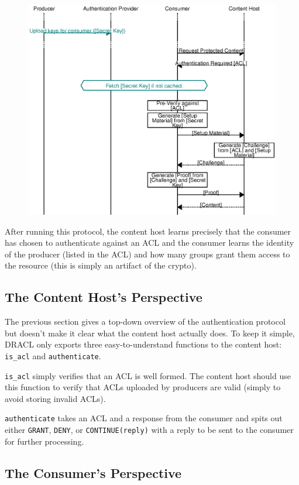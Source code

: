 \documentclass[pdftex,12pt,a4papaer,twoside,notitlepage]{report}
\begin{document}
\begin{figure}[H]
    \includegraphics{auth.eps}
\end{figure}

After running this protocol, the content host learns precisely that the consumer
has chosen to authenticate against an ACL and the consumer learns the identity
of the producer (listed in the ACL) and how many groups grant them access to the
resource (this is simply an artifact of the crypto).

\subsection{The Content Host's Perspective}

The previous section gives a top-down overview of the authentication protocol
but doesn't make it clear what the content host actually does. To keep it
simple, DRACL only exports three easy-to-understand functions to the content
host: \verb=is_acl= and \verb=authenticate=.

\verb=is_acl= simply verifies that an ACL is well formed. The content host
should use this function to verify that ACLs uploaded by producers are valid
(simply to avoid storing invalid ACLs).

\verb=authenticate= takes an ACL and a response from the consumer and spits out
either \verb=GRANT=, \verb=DENY=, or \verb=CONTINUE(reply)= with a reply to be
sent to the consumer for further processing.

\subsection{The Consumer's Perspective}
\label{sec:consumer_perspective}
\end{document}
